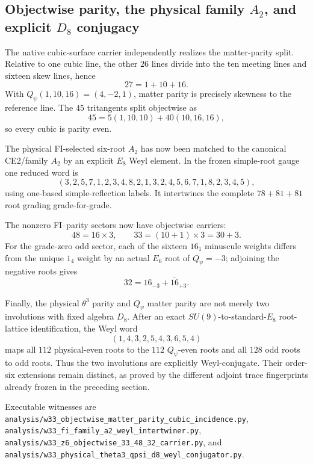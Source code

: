 \subsection*{Objectwise parity, the physical family $A_2$, and explicit $D_8$ conjugacy}

The native cubic-surface carrier independently realizes the matter-parity split.
Relative to one cubic line, the other $26$ lines divide into the ten meeting
lines and sixteen skew lines, hence
\[
27=1+10+16.
\]
With $Q_\psi(1,10,16)=(4,-2,1)$, matter parity is precisely skewness to the
reference line.  The $45$ tritangents split objectwise as
\[
45=5(1,10,10)+40(10,16,16),
\]
so every cubic is parity even.

The physical FI-selected six-root $A_2$ has now been matched to the canonical
CE2/family $A_2$ by an explicit $E_8$ Weyl element.  In the frozen simple-root
gauge one reduced word is
\[
(3,2,5,7,1,2,3,4,8,2,1,3,2,4,5,6,7,1,8,2,3,4,5),
\]
using one-based simple-reflection labels.  It intertwines the complete
$78+81+81$ root grading grade-for-grade.

The nonzero FI--parity sectors now have objectwise carriers:
\[
48=16\times3,\qquad 33=(10+1)\times3=30+3.
\]
For the grade-zero odd sector, each of the sixteen $16_1$ minuscule weights
differs from the unique $1_4$ weight by an actual $E_6$ root of
$Q_\psi=-3$; adjoining the negative roots gives
\[
32=16_{-3}+\overline{16}_{+3}.
\]

Finally, the physical $\theta^3$ parity and $Q_\psi$ matter parity are not
merely two involutions with fixed algebra $D_8$.  After an exact
$SU(9)$-to-standard-$E_8$ root-lattice identification, the Weyl word
\[
(1,4,3,2,5,4,3,6,5,4)
\]
maps all $112$ physical-even roots to the $112$ $Q_\psi$-even roots and all
$128$ odd roots to odd roots.  Thus the two involutions are explicitly
Weyl-conjugate.  Their order-six extensions remain distinct, as proved by the
different adjoint trace fingerprints already frozen in the preceding section.

Executable witnesses are
\texttt{analysis/w33\_objectwise\_matter\_parity\_cubic\_incidence.py},
\texttt{analysis/w33\_fi\_family\_a2\_weyl\_intertwiner.py},
\texttt{analysis/w33\_z6\_objectwise\_33\_48\_32\_carrier.py}, and
\texttt{analysis/w33\_physical\_theta3\_qpsi\_d8\_weyl\_conjugator.py}.
